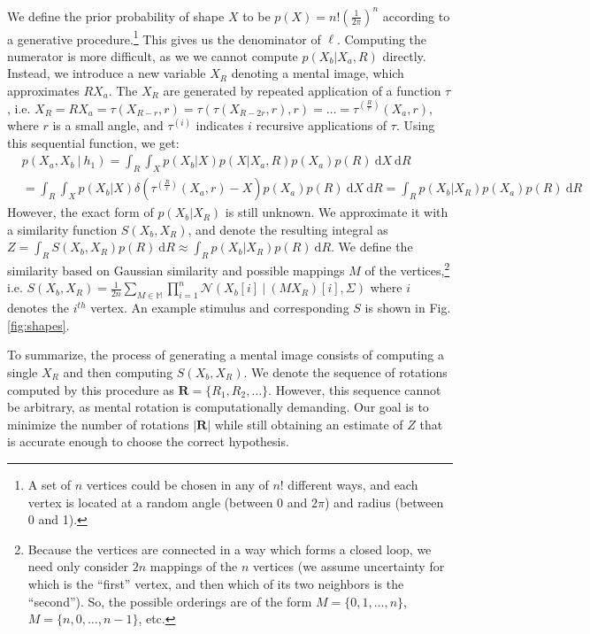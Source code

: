 \documentclass{article} %
\begin{document}
We define the prior probability of shape $X$ to be
$p(X)=n!\left(\frac{1}{2\pi}\right)^n$ according to a generative
procedure.\footnote{A set of $n$ vertices could be chosen in any of
  $n!$ different ways, and each vertex is located at a random angle
  (between 0 and $2\pi$) and radius (between 0 and 1).} This gives us
the denominator of $\ell$. Computing the numerator is more difficult,
as we we cannot compute $p(X_b\vert X_a, R)$ directly. Instead, we
introduce a new variable $X_R$ denoting a mental image, which
approximates $RX_a$. The $X_R$ are generated by repeated application
of a function $\tau$, i.e. $X_R=RX_a=\tau(X_{R-r},
r)=\tau(\tau(X_{R-2r}, r), r)=\ldots{}=\tau^{(\frac{R}{r})}(X_a, r)$,
where $r$ is a small angle, and $\tau^{(i)}$ indicates $i$ recursive
applications of $\tau$. Using this sequential function, we get:
\begin{align}
  &p(X_a, X_b\ \vert \ h_1)=\int_R \int_{X} p(X_b\vert X) p(X\vert X_a, R)p(X_a)p(R)\ \mathrm{d}X\ \mathrm{d}R \nonumber \\
  &= \int_R \int_X p(X_b\vert X)\delta(\tau^{(\frac{R}{r})}(X_a, r)-X)p(X_a)p(R)\ \mathrm{d}X\ \mathrm{d}R = \int_R p(X_b\vert X_R)p(X_a)p(R)\ \mathrm{d}R
\end{align}
However, the exact form of $p(X_b\vert X_R)$ is still unknown. We
approximate it with a similarity function $S(X_b, X_R)$, and denote
the resulting integral as $Z=\int_R S(X_b, X_R)p(R)\
\mathrm{d}R\approx \int_R p(X_b\vert X_R)p(R)\ \mathrm{d}R$.  We
define the similarity based on Gaussian similarity and possible
mappings $M$ of the vertices,\footnote{Because the vertices are
  connected in a way which forms a closed loop, we need only consider
  $2n$ mappings of the $n$ vertices (we assume uncertainty for which
  is the ``first'' vertex, and then which of its two neighbors is the
  ``second''). So, the possible orderings are of the form
  $M=\lbrace{}0, 1, \ldots{}, n\rbrace{}$, $M=\lbrace{}n, 0, \ldots{},
  n-1\rbrace{}$, etc.} i.e. $S(X_b,
X_R)=\frac{1}{2n}\sum_{M\in\mathbb{M}}\prod_{i=1}^n\mathcal{N}(X_b[i]\
\vert \ (MX_R)[i], \Sigma)$ where $i$ denotes the $i^{th}$ vertex. An
example stimulus and corresponding $S$ is shown in Fig.
\ref{fig:shapes}.

To summarize, the process of generating a mental image consists of
computing a single $X_R$ and then computing $S(X_b, X_R)$. We denote
the sequence of rotations computed by this procedure as
$\mathbf{R}=\{R_1, R_2, \ldots{}\}$. However, this sequence cannot be
arbitrary, as mental rotation is computationally demanding. Our goal
is to minimize the number of rotations $\vert\mathbf{R}\vert$ while
still obtaining an estimate of $Z$ that is accurate enough to choose
the correct hypothesis.
\end{document}
